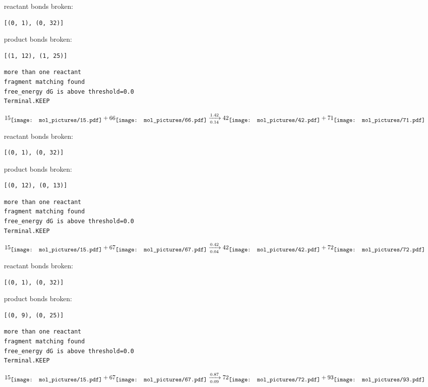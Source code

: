 \documentclass{article}
\begin{document}
reactant bonds broken:\begin{verbatim}
[(0, 1), (0, 32)]
\end{verbatim}
product bonds broken:\begin{verbatim}
[(1, 12), (1, 25)]
\end{verbatim}




\vspace{1cm}
\begin{verbatim}
more than one reactant
fragment matching found
free_energy dG is above threshold=0.0
Terminal.KEEP
\end{verbatim}
$$
15
\raisebox{-.5\height}{\texttt{[image: mol\_pictures/15.pdf]}}
+
66
\raisebox{-.5\height}{\texttt{[image: mol\_pictures/66.pdf]}}
\xrightarrow[0.14]{1.42}
42
\raisebox{-.5\height}{\texttt{[image: mol\_pictures/42.pdf]}}
+
71
\raisebox{-.5\height}{\texttt{[image: mol\_pictures/71.pdf]}}
$$


reactant bonds broken:\begin{verbatim}
[(0, 1), (0, 32)]
\end{verbatim}
product bonds broken:\begin{verbatim}
[(0, 12), (0, 13)]
\end{verbatim}




\vspace{1cm}
\begin{verbatim}
more than one reactant
fragment matching found
free_energy dG is above threshold=0.0
Terminal.KEEP
\end{verbatim}
$$
15
\raisebox{-.5\height}{\texttt{[image: mol\_pictures/15.pdf]}}
+
67
\raisebox{-.5\height}{\texttt{[image: mol\_pictures/67.pdf]}}
\xrightarrow[0.04]{0.42}
42
\raisebox{-.5\height}{\texttt{[image: mol\_pictures/42.pdf]}}
+
72
\raisebox{-.5\height}{\texttt{[image: mol\_pictures/72.pdf]}}
$$


reactant bonds broken:\begin{verbatim}
[(0, 1), (0, 32)]
\end{verbatim}
product bonds broken:\begin{verbatim}
[(0, 9), (0, 25)]
\end{verbatim}




\vspace{1cm}
\begin{verbatim}
more than one reactant
fragment matching found
free_energy dG is above threshold=0.0
Terminal.KEEP
\end{verbatim}
$$
15
\raisebox{-.5\height}{\texttt{[image: mol\_pictures/15.pdf]}}
+
67
\raisebox{-.5\height}{\texttt{[image: mol\_pictures/67.pdf]}}
\xrightarrow[0.09]{0.87}
72
\raisebox{-.5\height}{\texttt{[image: mol\_pictures/72.pdf]}}
+
93
\raisebox{-.5\height}{\texttt{[image: mol\_pictures/93.pdf]}}
$$
\end{document}
